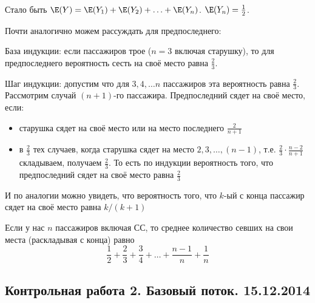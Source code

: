 \begin{enumerate}
\begin{enumerate}
Стало быть $\E(Y)=\E(Y_1)+\E(Y_2)+\ldots+\E(Y_n)$. $\E(Y_n)=\frac{1}{2}$.

Почти аналогично можем рассуждать для предпоследнего:

База индукции: если пассажиров трое ($n=3$ включая старушку), то для предпоследнего вероятность сесть на своё место равна $\frac{2}{3}$.

Шаг индукции: допустим что для $3, 4, \ldots n$ пассажиров эта вероятность равна $\frac{2}{3}$.
Рассмотрим случай $(n+1)$-го пассажира.
Предпоследний сядет на своё место, если:

\renewcommand{\labelitemi}{\textbullet}

\begin{itemize}
\item старушка сядет на своё место или на место последнего $\frac{2}{n+1}$
\item в $\frac{2}{3}$ тех случаев, когда старушка сядет на место $2, 3, \ldots, (n-1)$, т.е. $\frac{2}{3}\cdot \frac{n-2}{n+1}$
складываем, получаем $\frac{2}{3}$.
То есть по индукции вероятность того, что предпоследний сядет на своё место равна $\frac{2}{3}$
\end{itemize}
И по аналогии можно увидеть, что вероятность того, что $k$-ый с конца пассажир сядет на своё место равна $k/(k+1)$

Если у нас $n$ пассажиров включая СС, то среднее количество севших на свои места (раскладывая с конца) равно \[\frac{1}{2}+\frac{2}{3}+\frac{3}{4}+\dots+\frac{n-1}{n}+\frac{1}{n}\]

\end{enumerate}

\end{enumerate}



\subsection{Контрольная работа 2. Базовый поток. 15.12.2014}


